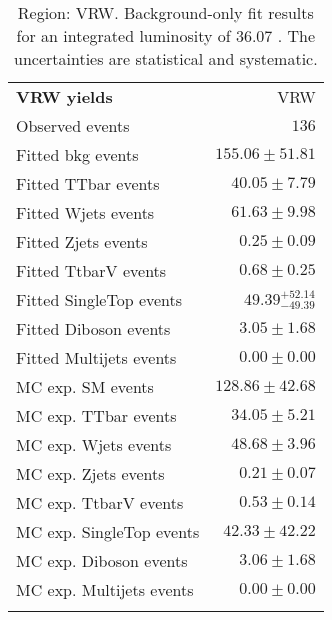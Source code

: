 

\begin{table}
\begin{center}
\setlength{\tabcolsep}{0.0pc}
{\small
\begin{tabular*}{\textwidth}{@{\extracolsep{\fill}}lr}
\noalign{\smallskip}\hline\noalign{\smallskip}
{\bf VRW yields}           & VRW              \\[-0.05cm]
\noalign{\smallskip}\hline\noalign{\smallskip}
Observed events          & $136$                    \\
\noalign{\smallskip}\hline\noalign{\smallskip}
Fitted bkg events         & $155.06 \pm 51.81$              \\
\noalign{\smallskip}\hline\noalign{\smallskip}
        Fitted TTbar events         & $40.05 \pm 7.79$              \\
        Fitted Wjets events         & $61.63 \pm 9.98$              \\
        Fitted Zjets events         & $0.25 \pm 0.09$              \\
        Fitted TtbarV events         & $0.68 \pm 0.25$              \\
        Fitted SingleTop events         & $49.39_{-49.39}^{+52.14}$              \\
        Fitted Diboson events         & $3.05 \pm 1.68$              \\
        Fitted Multijets events         & $0.00 \pm 0.00$              \\
 \noalign{\smallskip}\hline\noalign{\smallskip}
MC exp. SM events              & $128.86 \pm 42.68$              \\
\noalign{\smallskip}\hline\noalign{\smallskip}
        MC exp. TTbar events         & $34.05 \pm 5.21$              \\
        MC exp. Wjets events         & $48.68 \pm 3.96$              \\
        MC exp. Zjets events         & $0.21 \pm 0.07$              \\
        MC exp. TtbarV events         & $0.53 \pm 0.14$              \\
        MC exp. SingleTop events         & $42.33 \pm 42.22$              \\
        MC exp. Diboson events         & $3.06 \pm 1.68$              \\
        MC exp. Multijets events         & $0.00 \pm 0.00$              \\
\noalign{\smallskip}\hline\noalign{\smallskip}
\end{tabular*}
}
\end{center}
\caption{Region: VRW. Background-only fit results for an integrated luminosity of 36.07 \ifb. The uncertainties are statistical and systematic.
}
\label{table.bkgonly.VRW}
\end{table}
%